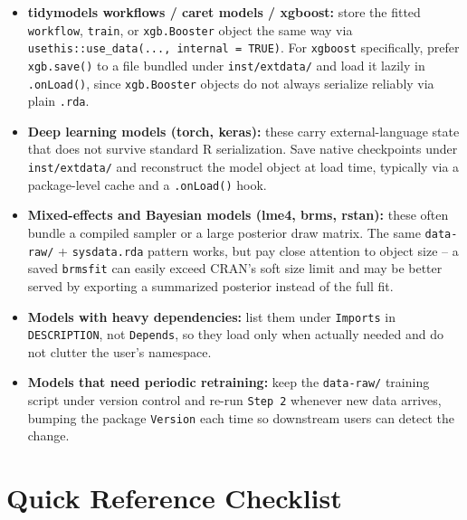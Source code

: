 \documentclass[11pt]{article}
\begin{document}
\begin{itemize}[itemsep=3pt]
  \item \textbf{tidymodels workflows / caret models / xgboost:} store the fitted \texttt{workflow}, \texttt{train}, or \texttt{xgb.Booster} object the same way via \texttt{usethis::use\_data(..., internal = TRUE)}. For \texttt{xgboost} specifically, prefer \texttt{xgb.save()} to a file bundled under \texttt{inst/extdata/} and load it lazily in \texttt{.onLoad()}, since \texttt{xgb.Booster} objects do not always serialize reliably via plain \texttt{.rda}.
  \item \textbf{Deep learning models (torch, keras):} these carry external-language state that does not survive standard R serialization. Save native checkpoints under \texttt{inst/extdata/} and reconstruct the model object at load time, typically via a package-level cache and a \texttt{.onLoad()} hook.
  \item \textbf{Mixed-effects and Bayesian models (lme4, brms, rstan):} these often bundle a compiled sampler or a large posterior draw matrix. The same \texttt{data-raw/} + \texttt{sysdata.rda} pattern works, but pay close attention to object size -- a saved \texttt{brmsfit} can easily exceed CRAN's soft size limit and may be better served by exporting a summarized posterior instead of the full fit.
  \item \textbf{Models with heavy dependencies:} list them under \texttt{Imports} in \texttt{DESCRIPTION}, not \texttt{Depends}, so they load only when actually needed and do not clutter the user's namespace.
  \item \textbf{Models that need periodic retraining:} keep the \texttt{data-raw/} training script under version control and re-run \texttt{Step 2} whenever new data arrives, bumping the package \texttt{Version} each time so downstream users can detect the change.
\end{itemize}

\section{Quick Reference Checklist}
\end{document}
